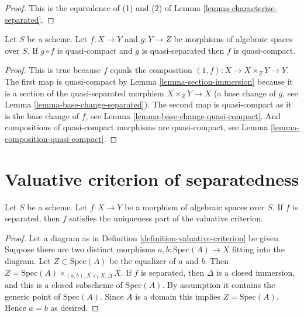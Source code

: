 \begin{proof}
This is the equivalence of (1) and (2) of
Lemma \ref{lemma-characterize-separated}.
\end{proof}

\begin{lemma}
\label{lemma-quasi-compact-permanence}
Let $S$ be a scheme.
Let $f : X \to Y$ and $g : Y \to Z$ be morphisms of algebraic spaces over $S$.
If $g \circ f$ is quasi-compact and $g$ is quasi-separated
then $f$ is quasi-compact.
\end{lemma}

\begin{proof}
This is true because $f$ equals the composition
$(1, f) : X \to X \times_Z Y \to Y$. The first map
is quasi-compact by Lemma \ref{lemma-section-immersion}
because it is a section of the quasi-separated morphism $X \times_Z Y \to X$
(a base change of $g$, see Lemma \ref{lemma-base-change-separated}).
The second map is quasi-compact as it
is the base change of $f$, see
Lemma \ref{lemma-base-change-quasi-compact}.
And compositions of quasi-compact
morphisms are quasi-compact, see Lemma \ref{lemma-composition-quasi-compact}.
\end{proof}






\section{Valuative criterion of separatedness}
\label{section-valuative-separatedness}

\begin{lemma}
\label{lemma-separated-implies-valuative}
Let $S$ be a scheme.
Let $f : X \to Y$ be a morphism of algebraic spaces over $S$.
If $f$ is separated, then $f$ satisfies the uniqueness
part of the valuative criterion.
\end{lemma}

\begin{proof}
Let a diagram as in Definition \ref{definition-valuative-criterion}
be given. Suppose there are two distinct morphisms
$a, b : \text{Spec}(A) \to X$ fitting into the diagram.
Let $Z \subset \text{Spec}(A)$ be the equalizer of $a$ and $b$.
Then $Z = \text{Spec}(A) \times_{(a, b), X \times_Y X, \Delta} X$.
If $f$ is separated, then $\Delta$ is a closed immersion, and
this is a closed subscheme of $\text{Spec}(A)$. By assumption it contains
the generic point of $\text{Spec}(A)$. Since $A$ is a domain
this implies $Z = \text{Spec}(A)$. Hence $a = b$ as desired.
\end{proof}

